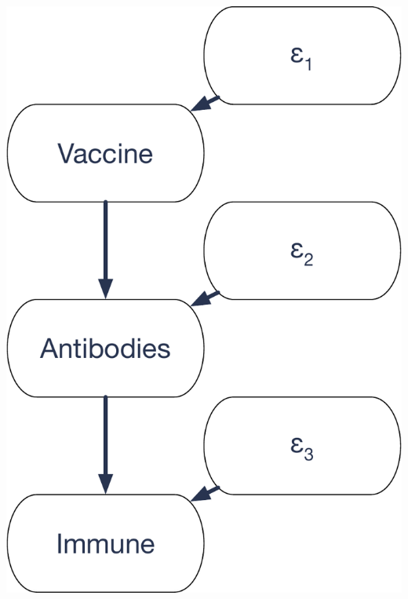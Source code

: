 \documentclass[12pt, block=fill]{beamer}
\begin{document}
\begin{frame}
\begin{columns}
    \begin{column}{0.4\textwidth}
      \includegraphics[width=\textwidth]{images/vaccine_graph}
    \end{column}
  \end{columns}


\end{frame}
\end{document}
